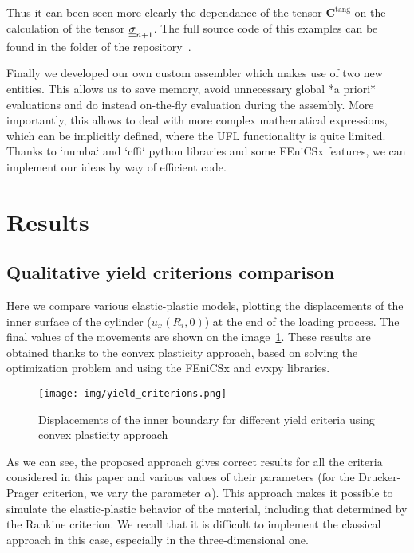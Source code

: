 \documentclass[12pt]{article}
\begin{document}
Thus it can been seen more clearly the dependance of the tensor $\mathbf{C}^\text{tang}$ on the calculation of the tensor $\underline{\underline{\sigma}}_{n+1}$. The full source code of this examples can be found in the  folder of the repository~\parencite{convex-plasticity}.

Finally we developed our own custom assembler which makes use of two new entities. This allows us to save memory, avoid unnecessary global *a priori* evaluations and do instead on-the-fly evaluation during the assembly. More importantly, this allows to deal with more complex mathematical expressions, which can be implicitly defined, where the UFL functionality is quite limited. Thanks to `numba` and `cffi` python libraries and some FEniCSx features, we can implement our ideas by way of efficient code. 

\newpage
\section{Results}

\subsection{Qualitative yield criterions comparison}

Here we compare various elastic-plastic models, plotting the displacements of the inner surface of the cylinder ($u_x(R_i, 0)$) at the end of the loading process. The final values of the movements are shown on the image~\ref{fig:yield_criteria}. These results are obtained thanks to the convex plasticity approach, based on solving the optimization problem and using the FEniCSx and cvxpy libraries.
\begin{figure}[H]
    \center
    \texttt{[image: img/yield\_criterions.png]}
    \caption{Displacements of the inner boundary for different yield criteria using convex plasticity approach}
    \label{fig:yield_criteria}
\end{figure}
As we can see, the proposed approach gives correct results for all the criteria considered in this paper and various values of their parameters (for the Drucker-Prager criterion, we vary the parameter $\alpha$). This approach makes it possible to simulate the elastic-plastic behavior of the material, including that determined by the Rankine criterion. We recall that it is difficult to implement the classical approach in this case, especially in the three-dimensional one.
\end{document}
